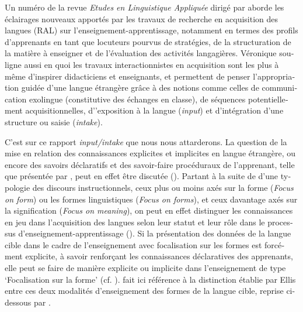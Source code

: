 \documentclass[output=paper]{langscibook}
\begin{document}
\begin{otherlanguage}{french}
Un numéro de la revue \textit{Etudes en Linguistique Appliquée} dirigé par \citet{Véronique2000} aborde les éclairages nouveaux apportés par les travaux de recherche en acquisition des langues (RAL) sur l’enseignement-apprentissage, notamment en termes des profils d’apprenants en tant que locuteurs pourvus de stratégies, de la structuration de la matière à enseigner et de l’évaluation des activités langagières. Véronique souligne aussi en quoi les travaux interactionnistes en acquisition sont les plus à même d’inspirer didacticiens et enseignants, et permettent de penser l’appropriation guidée d’une langue étrangère grâce à des notions comme celles de communication exolingue (constitutive des échanges en classe), de séquences potentiellement acquisitionnelles, d’’exposition à la langue (\textit{input}) et d’intégration d’une structure ou saisie (\textit{intake}). 

C’est sur ce rapport \textit{input/intake} que nous nous attarderons. La question de la mise en relation des connaissances explicites et implicites en langue étrangère, ou encore des savoirs déclaratifs et des savoir-faire procéduraux de l’apprenant, telle que présentée par \citet{Ellis2005}, peut en effet être discutée (\cite{LaurensVéronique2017}). Partant à la suite de \citet{Long1991} d’une typologie des discours instructionnels, ceux plus ou moins axés sur la forme (\textit{Focus on form}) ou les formes linguistiques (\textit{Focus on forms}), et ceux davantage axés sur la signification (\textit{Focus on meaning}),  on peut en effet distinguer les connaissances en jeu dans l’acquisition des langues selon leur statut et leur rôle dans le processus d’enseignement-apprentissage (\cite{Véronique2019}). Si la présentation des données de la langue cible dans le cadre de l’enseignement avec focalisation sur les formes est forcément explicite, à savoir renforçant les connaissances déclaratives des apprenants, elle peut se faire de manière explicite ou implicite dans l’enseignement de type ‘Focalisation sur la forme’ (cf. ). \citet{Véronique2019} fait ici référence à la distinction établie par Ellis entre ces deux modalités d’enseignement des formes de la langue cible, reprise ci-dessous par \citet[10]{HousenPierrard2005}.




\end{otherlanguage}
\end{document}
